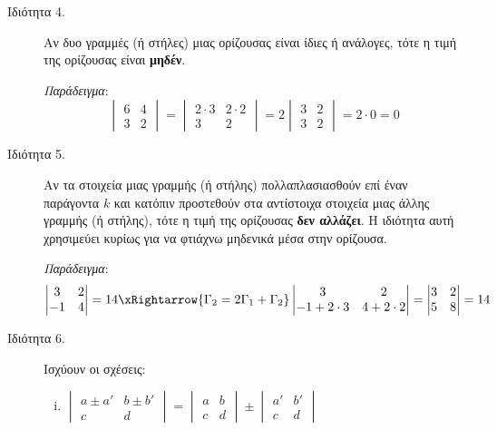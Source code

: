 \begin{description}
  \item[Ιδιότητα 4.] Αν δυο γραμμές (ή στήλες) μιας ορίζουσας είναι ίδιες ή ανάλογες, 
    τότε η τιμή της ορίζουσας είναι \textbf{μηδέν}.

    \textit{Παράδειγμα}: 
    \[
      \begin{vmatrix}
        6 & 4\\
        3 & 2 
        \end{vmatrix} = \begin{vmatrix}
        2\cdot 3 & 2\cdot 2\\
        3 & 2 
        \end{vmatrix} = 2\begin{vmatrix}
        3 & 2 \\
        3 & 2 
      \end{vmatrix}=2\cdot 0 = 0
    \]

  \item[Ιδιότητα 5.] Αν τα στοιχεία μιας γραμμής (ή στήλης) πολλαπλασιασθούν επί 
    έναν παράγοντα $k$ και κατόπιν προστεθούν στα αντίστοιχα στοιχεία μιας άλλης 
    γραμμής (ή στήλης), τότε η τιμή της ορίζουσας \textbf{δεν αλλάζει}. Η ιδιότητα 
    αυτή χρησιμεύει κυρίως για να φτιάχνω μηδενικά μέσα στην ορίζουσα.

    \textit{Παράδειγμα}:
    \[
      \begin{vmatrix}
        3 & 2\\
        -1 & 4
      \end{vmatrix}=14
      \xRightarrow{\Gamma_2=2\Gamma_1+\Gamma_2}\begin{vmatrix}
        3 & 2 \\
        -1 + 2\cdot 3 & 4 + 2\cdot 2 
        \end{vmatrix}=\begin{vmatrix}
        3 & 2\\
        5 & 8 
      \end{vmatrix}=14
    \]

  \item[Ιδιότητα 6.] Ισχύουν οι σχέσεις:
    \begin{enumerate}[i),itemsep=\baselineskip]

      \item $
        \begin{vmatrix}
          a\pm a' & b\pm b'\\
          c & d 
        \end{vmatrix}
        =
        \begin{vmatrix}
          a & b \\
          c & d 
        \end{vmatrix}
        \pm
        \begin{vmatrix}
          a' & b' \\
          c & d 
        \end{vmatrix}
        $


\end{enumerate}
\end{description}
